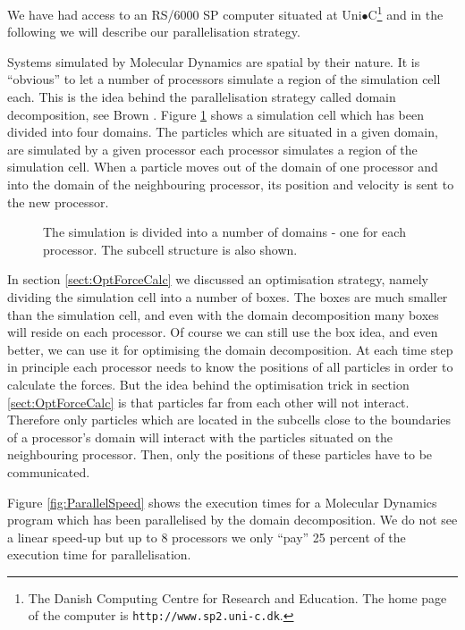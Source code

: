 We have had access to an RS/6000 SP computer situated at
Uni$\bullet$C\footnote{The Danish Computing Centre for Research and Education.
The home page of the computer is \texttt{http://www.sp2.uni-c.dk}.} and
in the following we will describe our parallelisation strategy.

Systems simulated by Molecular Dynamics are spatial by their nature. It
is ``obvious'' to let a number of processors simulate a region of the
simulation cell each. This is the idea behind the parallelisation strategy
called domain decomposition, see \eg Brown \etal
\cite{Brown93}. Figure \ref{fig:DomainDecomp} shows a simulation cell
which has been divided into four domains. The particles which are
situated in a given domain, are simulated by a given processor \ie
each processor simulates a region of the simulation cell. When a
particle moves out of the domain of one processor and into the domain
of the neighbouring processor, its position and velocity is sent to
the new processor. 

\begin{figure}
  \begin{center}
    
  \end{center}
  \caption[Domain decomposition]{The simulation is divided into a
  number of domains - one for each processor. The subcell structure is
  also shown.\label{fig:DomainDecomp}} 
\end{figure}

In section \ref{sect:OptForceCalc} we discussed an optimisation
strategy, namely dividing the simulation cell into a number of
boxes. The boxes are much smaller than the simulation cell, and
even with the domain decomposition many boxes will reside on each
processor. Of course we can still use the box idea, and
even better, we can use it for optimising the domain decomposition. At
each time step in principle each processor needs to know the positions
of all particles in order to calculate the forces. But the idea behind
the optimisation trick in section \ref{sect:OptForceCalc} is that
particles far from each other will not interact. Therefore
only particles which are located in the subcells close to the
boundaries of a processor's domain will interact with the particles
situated on the neighbouring processor. Then, only the positions of
these particles have to be communicated. 

Figure \ref{fig:ParallelSpeed} shows the execution times for a
Molecular Dynamics program which has been parallelised by the domain
decomposition. We do not see a linear speed-up but up to 8 processors
we only ``pay'' 25 percent of the execution time for parallelisation.

